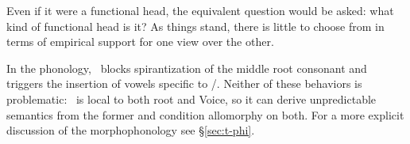 Even if it were a functional head, the equivalent question would be asked: what kind of functional head is it? As things stand, there is little to choose from in terms of empirical support for one view over the other.

In the phonology, \va~blocks spirantization of the middle root consonant and triggers the insertion of vowels specific to \tpie/\thit. Neither of these behaviors is problematic: \va~is local to both root and Voice, so it can derive unpredictable semantics from the former and condition allomorphy on both. For a more explicit discussion of the morphophonology see \S\ref{sec:t-phi}.

